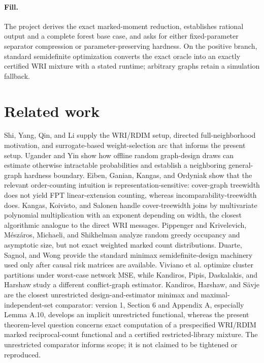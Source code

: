 \documentclass{article}
\begin{document}
\paragraph{Fill.} The project derives the exact marked-moment reduction, establishes rational output and a complete forest base case, and asks for either fixed-parameter separator compression or parameter-preserving hardness. On the positive branch, standard semidefinite optimization converts the exact oracle into an exactly certified WRI mixture with a stated runtime; arbitrary graphs retain a simulation fallback.

\section{Related work}

Shi, Yang, Qin, and Li supply the WRI/RDIM setup, directed full-neighborhood motivation, and surrogate-based weight-selection arc that informs the present setup. Ugander and Yin show how offline random graph-design draws can estimate otherwise intractable probabilities and establish a neighboring general-graph hardness boundary. Eiben, Ganian, Kangas, and Ordyniak show that the relevant order-counting intuition is representation-sensitive: cover-graph treewidth does not yield FPT linear-extension counting, whereas incomparability-treewidth does. Kangas, Koivisto, and Salonen handle cover-treewidth joins by multivariate polynomial multiplication with an exponent depending on width, the closest algorithmic analogue to the direct WRI messages. Pippenger and Krivelevich, Mészáros, Michaeli, and Shikhelman analyze random greedy occupancy and asymptotic size, but not exact weighted marked count distributions. Duarte, Sagnol, and Wong provide the standard minimax semidefinite-design machinery used only after causal risk matrices are available. Viviano et al. optimize cluster partitions under worst-case network MSE, while Kandiros, Pipis, Daskalakis, and Harshaw study a different conflict-graph estimator. Kandiros, Harshaw, and Sävje are the closest unrestricted design-and-estimator minimax and maximal-independent-set comparator: version 1, Section 6 and Appendix A, especially Lemma A.10, develops an implicit unrestricted functional, whereas the present theorem-level question concerns exact computation of a prespecified WRI/RDIM marked reciprocal-count functional and a certified restricted-library mixture. The unrestricted comparator informs scope; it is not claimed to be tightened or reproduced.
\end{document}
